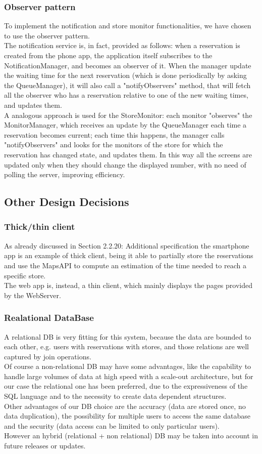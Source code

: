 \subsubsection{Observer pattern}
To implement the notification and store monitor functionalities, we have chosen to use the observer pattern.\\
The notification service is, in fact, provided as follows:
when a reservation is created from the phone app, the application itself subscribes to the NotificationManager, and becomes an observer of it. When the manager update the waiting time for the next reservation (which is done periodically by asking the QueueManager), it will also call a "notifyObservers" method, that will fetch all the observer who has a reservation relative to one of the new waiting times, and updates them.\\
A analogous approach is used for the StoreMonitor: each monitor "observes" the MonitorManager, which receives an update by the QueueManager each time a reservation becomes current; each time this happens, the manager calls "notifyObservers" and looks for the monitors of the store for which the reservation has changed state, and updates them. In this way all the screens are updated only when they should change the displayed number, with no need of polling the server, improving efficiency.
\subsection{Other Design Decisions}
\subsubsection{Thick/thin client}
As already discussed in Section 2.2.20: Additional specification the smartphone app is an example of thick client, being it able to partially store the reservations and use the MapsAPI to compute an estimation of the time needed to reach a specific store.\\ The web app is, instead, a thin client, which mainly displays the pages provided by the WebServer.
\subsubsection{Realational DataBase}
A relational DB is very fitting for this system, because the data are bounded to each other, e.g. users with reservations with stores, and those relations are well captured by join operations.\\
Of course a non-relational DB may have some advantages, like the capability to handle large volumes of data at high speed with a scale-out architecture, but for our case the relational one has been preferred, due to the expressiveness of the SQL language and to the necessity to create data dependent structures.\\
Other advantages of our DB choice are the accuracy (data are stored once, no data duplication), the possibility for multiple users to access the same database and the security (data access can be limited to only particular users).\\
However an hybrid (relational + non relational) DB may be taken into account in future releases or updates.